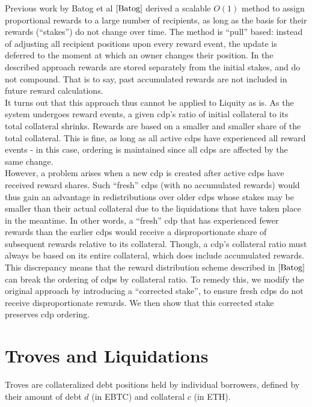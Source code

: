 \documentclass[reqno]{article}
\begin{document}
Previous work by Batog et al $\cite{Batog}$ derived a scalable $O(1)$ method to assign proportional rewards to a large number of recipients, as long as the basis for their rewards (“stakes”) do not change over time. The method is “pull” based: instead of adjusting all recipient positions upon every reward event, the update is deferred to the moment at which an owner changes their position. In the described approach rewards are stored separately from the initial stakes, and do not compound. That is to say, past accumulated rewards are not included in future reward calculations. \\

It turns out that this approach thus cannot be applied to Liquity as is. As the system undergoes reward events, a given cdp’s ratio of initial collateral to its total collateral shrinks. Rewards are based on a smaller and smaller share of the total collateral. This is fine, as long as all active cdps have experienced all reward events - in this case, ordering is maintained since all cdps are affected by the same change. \\

However, a problem arises when a new cdp is created after active cdps have received reward shares.  Such “fresh” cdps (with no accumulated rewards) would thus gain an advantage in redistributions over older cdps whose stakes may be smaller than their actual collateral due to the liquidations that have taken place in the meantime. In other words, a “fresh” cdp that has experienced fewer rewards than the earlier cdps would receive a disproportionate share of subsequent rewards relative to its collateral. Though, a cdp's collateral ratio must always be based on its entire collateral, which does include accumulated rewards.  \\

This discrepancy means that the reward distribution scheme described in $\cite{Batog}$ can break the ordering of cdps by collateral ratio. To remedy this, we modify the original approach by introducing a “corrected stake”, to ensure fresh cdps do not receive disproportionate rewards. We then show that this corrected stake preserves cdp ordering. \\


\section{Troves and Liquidations}
Troves are collateralized debt positions held by individual borrowers, defined by their amount of debt $d$ (in EBTC) and collateral $c$ (in ETH).
\end{document}
